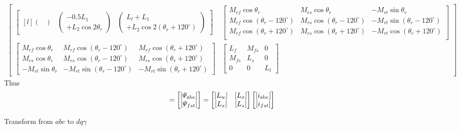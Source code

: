 \documentclass[a4paper,numbers=noenddot,12pt]{scrbook}
\begin{document}
\begin{multline}
\begin{bmatrix}
\begin{bmatrix*}[l]
\begin{pmatrix}
            \end{pmatrix}
            &
            \begin{pmatrix}
                -0.5 L_1 \\ + L_2 \cos 2 \theta_r
            \end{pmatrix}
            &
            \begin{pmatrix}
                L_l + L_1 \\ + L_2 \cos 2(\theta_r  + 120^{\circ})
            \end{pmatrix}
        \end{bmatrix*} &
        \begin{bmatrix}
            M_{rf} \cos \theta_r & M_{rs} \cos \theta_r & - M_{rt} \sin \theta_r \\
            M_{rf} \cos (\theta_r - 120^{\circ}) & M_{rs} \cos(\theta_r - 120^{\circ}) & - M_{rt} \sin (\theta_r - 120^{\circ}) \\ 
            M_{rf} \cos(\theta_r + 120^{\circ}) & M_{rs} \cos(\theta_r + 120^{\circ}) & - M_{rt} \cos(\theta_r + 120^{\circ}) \\
        \end{bmatrix}\\
        \begin{bmatrix}
            M_{rf} \cos\theta_r & M_{rf} \cos(\theta_r - 120^{\circ}) & M_{rf} \cos(\theta_r + 120^{\circ}) \\
            M_{rs} \cos\theta_r & M_{rs} \cos(\theta_r - 120^{\circ}) & M_{rs} \cos(\theta_r + 120^{\circ}) \\
            - M_{rt} \sin \theta_r & - M_{rt} \sin (\theta_r - 120^{\circ}) & - M_{rt} \sin(\theta_r + 120^{\circ})
        \end{bmatrix} &
        \begin{bmatrix}
            L_f & M_{fs} & 0 \\
            M_{fs} & L_s & 0 \\
            0 & 0 & L_t
        \end{bmatrix}
    \end{bmatrix}
    \label{eq:Eq8.22}
\end{multline}
Thus
\begin{equation}
    [\varPsi{\textup{abc}fst}] = 
    \begin{bmatrix}
        [\varPsi_{\textup{abc}}] \\
        [\varPsi_{fst}]
    \end{bmatrix}
    =
    \begin{bmatrix}
        [L_w] & [L_x] \\
        [L_x] & [L_z]
    \end{bmatrix}
    \begin{bmatrix}
        [i_{\textup{abc}}] \\
        [i_{fst}]
    \end{bmatrix}
    \label{eq:Eq8.23}
\end{equation}

Transform from $abc$ to $dq\gamma$
\end{document}
